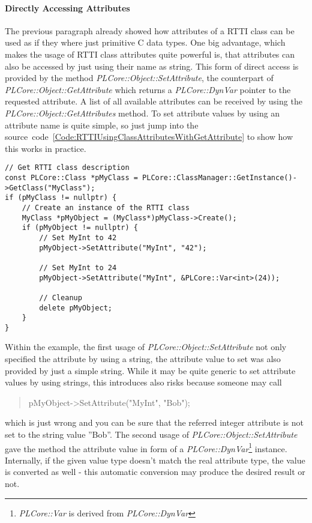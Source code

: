 \paragraph{Directly Accessing Attributes}
The previous paragraph already showed how attributes of a RTTI class can be used as if they where just primitive C data types. One big advantage, which makes the usage of RTTI class attributes quite powerful is, that attributes can also be accessed by just using their name as string. This form of direct access is provided by the method \emph{PLCore::Object::SetAttribute}, the counterpart of \emph{PLCore::Object::GetAttribute} which returns a \emph{PLCore::DynVar} pointer to the requested attribute. A list of all available attributes can be received by using the \emph{PLCore::Object::GetAttributes} method. To set attribute values by using an attribute name is quite simple, so just jump into the source~code~\ref{Code:RTTIUsingClassAttributesWithGetAttribute} to show how this works in practice.
\begin{lstlisting}[float=htb,label=Code:RTTIUsingClassAttributesWithGetAttribute,caption={Using RTTI class attributes with the PLCore::Object::SetAttribute method}]
// Get RTTI class description
const PLCore::Class *pMyClass = PLCore::ClassManager::GetInstance()->GetClass("MyClass");
if (pMyClass != nullptr) {
	// Create an instance of the RTTI class
	MyClass *pMyObject = (MyClass*)pMyClass->Create();
	if (pMyObject != nullptr) {
		// Set MyInt to 42
		pMyObject->SetAttribute("MyInt", "42");

		// Set MyInt to 24
		pMyObject->SetAttribute("MyInt", &PLCore::Var<int>(24));

		// Cleanup
		delete pMyObject;
	}
}
\end{lstlisting}
Within the example, the first usage of \emph{PLCore::Object::SetAttribute} not only specified the attribute by using a string, the attribute value to set was also provided by just a simple string. While it may be quite generic to set attribute values by using strings, this introduces also risks because someone may call \begin{quote}pMyObject->SetAttribute("MyInt", "Bob");\end{quote} which is just wrong and you can be sure that the referred integer attribute is not set to the string value ''Bob''. The second usage of \emph{PLCore::Object::SetAttribute} gave the method the attribute value in form of a \emph{PLCore::DynVar}\footnote{\emph{PLCore::Var} is derived from \emph{PLCore::DynVar}} instance. Internally, if the given value type doesn't match the real attribute type, the value is converted as well - this automatic conversion may produce the desired result or not.

